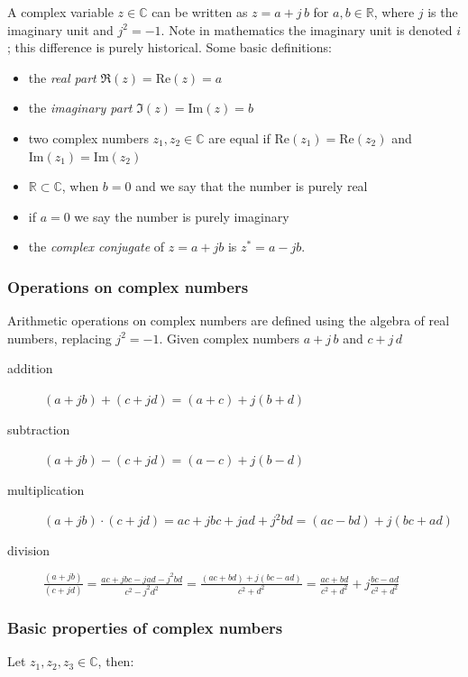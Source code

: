 A complex variable $z\in\mathbb{C}$ can be written as $z = a + j\, b$ for $a,b\in\mathbb{R}$, where $j$ is the imaginary unit and $j^2 = -1$. Note in mathematics the imaginary unit is denoted $i$; this difference is purely historical. Some basic definitions:

\begin{itemize}
\item the \emph{real part} $\Re(z) = \text{Re}(z) = a$
\item the \emph{imaginary part} $\Im(z) = \text{Im}(z) = b$
\item two complex numbers $z_1, z_2\in \mathbb{C}$ are equal if $\text{Re}(z_1) = \text{Re}(z_2)$ and $\text{Im}(z_1) = \text{Im}(z_2)$
\item $\mathbb{R} \subset \mathbb{C}$, when $b = 0$ and we say that the number is purely real
\item if $a = 0$ we say the number is purely imaginary
\item the \emph{complex conjugate} of $z = a + jb$ is $z^* = a - jb$.
\end{itemize}

\subsubsection*{Operations on complex numbers}

Arithmetic operations on complex numbers are defined using the algebra of real numbers, replacing $j^2 = -1$. Given complex numbers $a + j\, b$ and $c + j\, d$

\begin{description}
\item[addition] $(a + jb) + (c +jd) = (a+c) + j(b+d)$
\item[subtraction] $(a + jb) - (c +jd) = (a-c) + j(b-d)$
\item[multiplication] $(a + jb)\cdot(c +jd) = ac + jbc + jad + j^2 bd = (ac-bd) + j(bc+ad)$
\item[division] $\frac{(a + jb)}{(c +jd)} = \frac{ac+jbc-jad-j^2 bd}{c^2 -j^2 d^2} = \frac{(ac+bd) + j(bc-ad)}{c^2 + d^2} = \frac{ac+bd}{c^2 + d^2} + j \frac{bc-ad}{c^2 + d^2}$
\end{description}


\subsubsection*{Basic properties of complex numbers}

Let $z_1, z_2, z_3 \in \mathbb{C}$, then:

